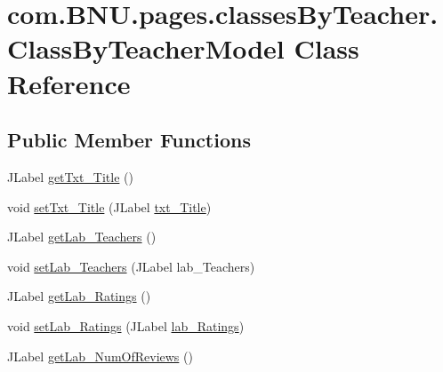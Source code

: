 \hypertarget{classcom_1_1_b_n_u_1_1pages_1_1classes_by_teacher_1_1_class_by_teacher_model}{}\section{com.\+B\+N\+U.\+pages.\+classes\+By\+Teacher.\+Class\+By\+Teacher\+Model Class Reference}
\label{classcom_1_1_b_n_u_1_1pages_1_1classes_by_teacher_1_1_class_by_teacher_model}
\subsection*{Public Member Functions}
\begin{DoxyCompactItemize}
\item 
J\+Label \mbox{\hyperlink{classcom_1_1_b_n_u_1_1pages_1_1classes_by_teacher_1_1_class_by_teacher_model_a097806d6932b455f8980d421b62edbf1}{get\+Txt\+\_\+\+Title}} ()
\item 
void \mbox{\hyperlink{classcom_1_1_b_n_u_1_1pages_1_1classes_by_teacher_1_1_class_by_teacher_model_a551740565b5e755ecab57470396f8d00}{set\+Txt\+\_\+\+Title}} (J\+Label \mbox{\hyperlink{classcom_1_1_b_n_u_1_1pages_1_1classes_by_teacher_1_1_class_by_teacher_model_af0afc2a21bdb3e4c161fd99a5474cc71}{txt\+\_\+\+Title}})
\item 
J\+Label \mbox{\hyperlink{classcom_1_1_b_n_u_1_1pages_1_1classes_by_teacher_1_1_class_by_teacher_model_aeae239bfd1099c9dfbf4d28c19d214e6}{get\+Lab\+\_\+\+Teachers}} ()
\item 
void \mbox{\hyperlink{classcom_1_1_b_n_u_1_1pages_1_1classes_by_teacher_1_1_class_by_teacher_model_a882e543de32aab6e0b2e1b483608d054}{set\+Lab\+\_\+\+Teachers}} (J\+Label lab\+\_\+\+Teachers)
\item 
J\+Label \mbox{\hyperlink{classcom_1_1_b_n_u_1_1pages_1_1classes_by_teacher_1_1_class_by_teacher_model_ae1619a8cbb806d7f4daff4c8691ca392}{get\+Lab\+\_\+\+Ratings}} ()
\item 
void \mbox{\hyperlink{classcom_1_1_b_n_u_1_1pages_1_1classes_by_teacher_1_1_class_by_teacher_model_a811b561dff723e1cabd56b7f6e06bcb8}{set\+Lab\+\_\+\+Ratings}} (J\+Label \mbox{\hyperlink{classcom_1_1_b_n_u_1_1pages_1_1classes_by_teacher_1_1_class_by_teacher_model_ac818d8d719e033aab497e6ca4a3f959a}{lab\+\_\+\+Ratings}})
\item 
J\+Label \mbox{\hyperlink{classcom_1_1_b_n_u_1_1pages_1_1classes_by_teacher_1_1_class_by_teacher_model_a88fb12c18885c6dec4dfecc7ca55bbf4}{get\+Lab\+\_\+\+Num\+Of\+Reviews}} ()

\end{DoxyCompactItemize}
